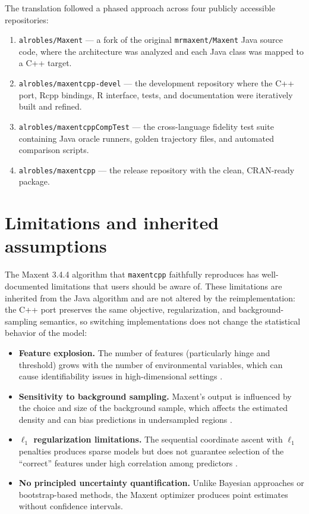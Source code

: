 \documentclass[10pt,letterpaper]{article}
\providecommand{\tightlist}{%
  \setlength{\itemsep}{0pt}\setlength{\parskip}{0pt}}
\begin{document}
The translation followed a phased approach across four publicly
accessible repositories:

\begin{enumerate}
\def\labelenumi{\arabic{enumi}.}
\tightlist
\item
  \texttt{alrobles/Maxent} --- a fork of the original
  \texttt{mrmaxent/Maxent} \cite{Phillips2017} Java source code, where
  the architecture was analyzed and each Java class was mapped to a C++
  target.
\item
  \texttt{alrobles/maxentcpp-devel} --- the development repository where
  the C++ port, Rcpp bindings, R interface, tests, and documentation
  were iteratively built and refined.
\item
  \texttt{alrobles/maxentcppCompTest} --- the cross-language fidelity
  test suite containing Java oracle runners, golden trajectory files,
  and automated comparison scripts.
\item
  \texttt{alrobles/maxentcpp} --- the release repository with the clean,
  CRAN-ready package.
\end{enumerate}

\section*{Limitations and inherited
assumptions}

The Maxent 3.4.4 algorithm that \texttt{maxentcpp} faithfully reproduces
has well-documented limitations that users should be aware of. These
limitations are inherited from the Java algorithm and are not altered by
the reimplementation: the C++ port preserves the same objective,
regularization, and background-sampling semantics, so switching
implementations does not change the statistical behavior of the model:

\begin{itemize}
\tightlist
\item
  \textbf{Feature explosion.} The number of features (particularly hinge
  and threshold) grows with the number of environmental variables, which
  can cause identifiability issues in high-dimensional settings
  \cite{Elith2011,Merow2013}.
\item
  \textbf{Sensitivity to background sampling.} Maxent's output is
  influenced by the choice and size of the background sample, which
  affects the estimated density and can bias predictions in undersampled
  regions \cite{Phillips2008}.
\item
  \textbf{\(\ell_1\) regularization limitations.} The sequential
  coordinate ascent with \(\ell_1\) penalties produces sparse models but
  does not guarantee selection of the ``correct'' features under high
  correlation among predictors \cite{Hastie2015}.
\item
  \textbf{No principled uncertainty quantification.} Unlike Bayesian
  approaches or bootstrap-based methods, the Maxent optimizer produces
  point estimates without confidence intervals.
\end{itemize}
\end{document}
